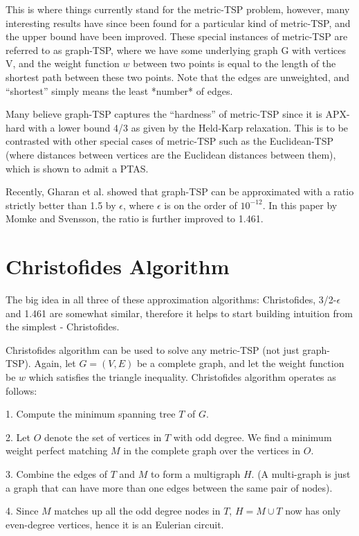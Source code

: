 \documentclass[12pt]{article}
\begin{document}
This is where things currently stand for the metric-TSP problem, however, many interesting results have since been found for a particular kind of metric-TSP, and the upper bound have been improved. These special instances of metric-TSP are referred to as graph-TSP, where we have some underlying graph G with vertices V, and the weight function $w$ between two points is equal to the length of the shortest path between these two points. Note that the edges are unweighted, and ``shortest'' simply means the least *number* of edges.

Many believe graph-TSP captures the ``hardness'' of metric-TSP since it is APX-hard with a lower bound 4/3 as given by the Held-Karp relaxation. This is to be contrasted with other special cases of metric-TSP such as the Euclidean-TSP (where distances between vertices are the Euclidean distances between them), which is shown to admit a PTAS.

Recently, Gharan et al. showed that graph-TSP can be approximated with a ratio strictly better than 1.5 by $\epsilon$, where $\epsilon$ is on the order of $10^{-12}$. In this paper by Momke and Svensson, the ratio is further improved to 1.461.

\section{Christofides Algorithm}

The big idea in all three of these approximation algorithms: Christofides, 3/2-$\epsilon$ and 1.461 are somewhat similar, therefore it helps to start building intuition from the simplest - Christofides.

Christofides algorithm can be used to solve any metric-TSP (not just graph-TSP). Again, let $G=(V,E)$ be a complete graph, and let the weight function be $w$ which satisfies the triangle inequality. Christofides algorithm operates as follows:

1. Compute the minimum spanning tree $T$ of $G$.

2. Let $O$ denote the set of vertices in $T$ with odd degree. We find a minimum weight perfect matching $M$ in the complete graph over the vertices in $O$.

3. Combine the edges of $T$ and $M$ to form a multigraph $H$. (A multi-graph is just a graph that can have more than one edges between the same pair of nodes).

4. Since $M$ matches up all the odd degree nodes in $T$, $H=M\cup T$ now has only even-degree vertices, hence it is an Eulerian circuit.
\end{document}
